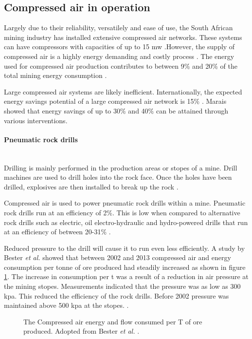 \subsection{Compressed air in operation}
	Largely due to their reliability, versatilely and ease of use, the South African mining industry has installed extensive compressed air networks. These systems can have compressors with capacities of up to 15 \gls{mw} \cite{Marais2012PhD}.However, the supply of compressed air is a highly energy demanding and costly process \cite{padachi2009energy}.  The energy used for compressed air production contributes to between 9\% and 20\% of the total mining energy consumption	\cite{Eskom2010Energy,du2011development}. 
	\par
	Large compressed air systems are likely inefficient. Internationally, the expected energy savings potential of a large compressed air network is 15\% \cite{neale2009compressed}. Marais \cite{marais2013simplification} showed that energy savings of up to 30\% and 40\% can be attained through various interventions. 
	\paragraph{Pneumatic rock drills}\leavevmode\\
	 Drilling is mainly performed in the production areas or stopes of a mine. Drill machines are used to drill holes into the rock face. Once the holes have been drilled, explosives are then installed to break up the rock \cite{van2008development}.
	 \par
	  Compressed air is used to power pneumatic rock drills within a mine. Pneumatic rock drills run at an efficiency of 2\%. This is low when compared to alternative rock drills such as electric, oil electro-hydraulic and hydro-powered drills that run at an efficiency of between 20-31\% \cite{fraser2008saving,vanTonder2010Masters}. 
	  \par
	  Reduced pressure to the drill will cause it to run even less efficiently. A study by  Bester \textit{et al.} showed that between 2002 and 2013 compressed air and energy consumption per tonne of ore produced had steadily increased as shown in figure \ref{fig: Compressed energy and air flow per ton}. The increase in consumption per \gls{t} was a result of a reduction in air pressure at the mining stopes. Measurements indicated that the pressure was as low as 300 \gls{kpa}. This reduced the efficiency of the rock drills. Before 2002 pressure was maintained above 500 \gls{kpa} at the stopes.  .\cite{bester2013effect} \par
	\begin{figure}[h]
	\centering
	\fbox{}
	\caption[The Compressed air energy and flow consumed per T of ore produced.]{The Compressed air energy and flow consumed per T of ore produced. Adopted from Bester \textit{et al.} \cite{bester2013effect}.}
	\label{fig: Compressed energy and air flow per ton}
	\end{figure}
